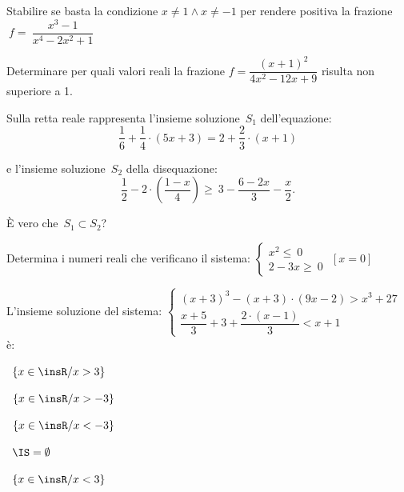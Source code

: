 \begin{esercizio}
 \label{ese:4.73}
Stabilire se basta la condizione \(x\neq 1\wedge x\neq -1\) per rendere 
positiva 
la frazione \(~f=~\dfrac{x^3-1}{x^4-2x^2+1}\)
\end{esercizio}

\begin{esercizio}
 \label{ese:4.74}
Determinare per quali valori reali la frazione 
\(f=\dfrac{(x+1)^2}{4x^2-12x+9}\) 
risulta non superiore a 1.
\end{esercizio}


\begin{esercizio}
 \label{ese:21.33}
Sulla retta reale rappresenta l'insieme soluzione~\(S_{1}\)
dell'equazione:
\[\dfrac{1}{6}+\dfrac{1}{4}\cdot (5x+3)=2+\dfrac{2}{3}\cdot (x+1)\]

e l'insieme soluzione~\(S_{2}\) della disequazione:
\[\dfrac{1}{2}-2\cdot\left(\dfrac{1-x}{4}\right)\ge~3-\dfrac{6-2x}{3}-\dfrac{x
}{2}.\]

È vero che~\(S_{1}\subset S_{2}\)?
\end{esercizio}

\begin{esercizio}[\Ast]
 \label{ese:21.34}
 Determina i numeri reali che verificano il sistema:
 \(\left\{%
  \begin{array}{l}
  x^{2}\le~0
  \\2-3x\ge~0
 \end{array}\right.\)
\hfill \(\left[x = 0\right]\)
 \end{esercizio}

\begin{esercizio}
 \label{ese:21.35}
 L'insieme soluzione del sistema:
\(\left\{\begin{array}{l}
  (x+3)^{3}-(x+3)\cdot (9x-2)>x^{3}+27\\
  \dfrac{x+5}{3}+3+\dfrac{2\cdot (x-1)}{3}<x+1
 \end{array}\right.\) è:
\begin{multicols}{2}
\boxA\quad~\(\left\{x\in \insR/x>3\right\}\)

\boxB\quad~\(\left\{x\in \insR/x>-3\right\}\)

\boxC\quad~\(\left\{x\in \insR/x<-3\right\}\)

\boxD\quad~\(\IS=\emptyset \)

\boxE\quad~\(\left\{x\in\insR/x<3\right\}\)
\end{multicols}

\end{esercizio}

